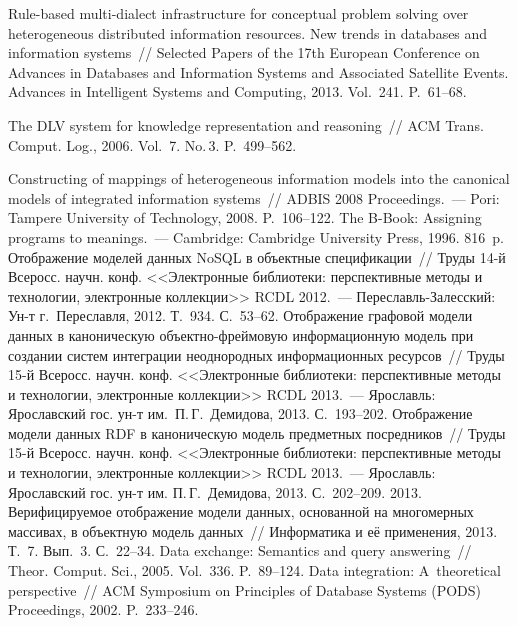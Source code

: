\begin{multicols}{2}
{{\begin{thebibliography}{99}
 Rule-based multi-dialect
infrastructure for conceptual problem solving over heterogeneous distributed information
resources. New trends in databases and information systems~// Selected Papers of the 17th
European Conference on Advances in Databases and Information Systems and Associated
Satellite Events. Advances in Intelligent Systems and Computing, 2013. Vol.~241.
P.~61--68.

 The
DLV system for knowledge representation and reasoning~// ACM Trans.
Comput. Log., 2006. Vol.~7. No.\,3. P.~499--562.

 Constructing of mappings of heterogeneous
information models into the canonical models of integrated information systems~// ADBIS
2008 Proceedings.~--- Pori: Tampere University of Technology, 2008. P.~106--122.
 The B-Book: Assigning programs to meanings.~--- Cambridge:
Cambridge University Press, 1996. 816~p.
 Отображение моделей данных NoSQL в объектные
спецификации~// Труды 14-й Всеросс. научн. конф. <<Электронные библиотеки:
перспективные методы и технологии, электронные коллекции>> RCDL 2012.~---
Переславль-Залесский: Ун-т г.~Переславля, 2012. Т.~934. С.~53--62.
 Отображение графовой модели данных в каноническую
объектно-фреймовую информационную модель при создании систем интеграции
неоднородных информационных ресурсов~// Труды 15-й Всеросс. научн. конф.
<<Электронные библиотеки:  перспективные методы и технологии, электронные
коллекции>> RCDL 2013.~--- Ярославль: Ярославский гос. ун-т
им.\ П.\,Г.~Демидова, 2013. С.~193--202.
 Отображение модели данных RDF в каноническую модель
предметных посредников~// Труды 15-й Всеросс. научн. конф. <<Электронные
библиотеки: перспективные методы и технологии, электронные коллекции>> RCDL
2013.~--- Ярославль: Ярославский гос. ун-т им. П.\,Г.~Демидова,
2013. С.~202--209.
 2013. Верифицируемое отображение модели данных,
основанной на многомерных массивах, в объектную модель данных~// Информатика и
её применения, 2013. Т.~7. Вып.~3. С.~22--34.
 Data exchange: Semantics and query
answering~// Theor. Comput. Sci., 2005. Vol.~336. P.~89--124.
 Data integration: A~theoretical perspective~// ACM Symposium on
Principles of Database Systems (PODS) Proceedings, 2002. P.~233--246.


\end{thebibliography}}}
\end{multicols}
